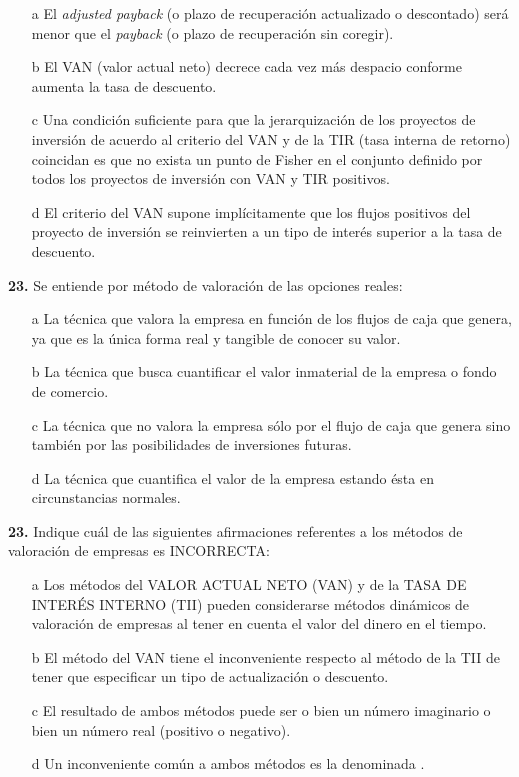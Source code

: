 \documentclass{nuevotema}
\begin{document}
\begin{enumerate}
    \item[a] El \textit{adjusted payback} (o plazo de recuperación actualizado o descontado) será menor que el \textit{payback} (o plazo de recuperación sin coregir).
    \item[b] El VAN (valor actual neto) decrece cada vez más despacio conforme aumenta la tasa de descuento.
    \item[c] Una condición suficiente para que la jerarquización de los proyectos de inversión de acuerdo al criterio del VAN y de la TIR (tasa interna de retorno) coincidan es que no exista un punto de Fisher en el conjunto definido por todos los proyectos de inversión con VAN y TIR positivos.
    \item[d] El criterio del VAN supone implícitamente que los flujos positivos del proyecto de inversión se reinvierten a un tipo de interés superior a la tasa de descuento.
\end{enumerate}

\textbf{23.} Se entiende por método de valoración de las opciones reales:

\begin{enumerate}
    \item[a] La técnica que valora la empresa en función de los flujos de caja que genera, ya que es la única forma real y tangible de conocer su valor.
    \item[b] La técnica que busca cuantificar el valor inmaterial de la empresa o fondo de comercio.
    \item[c] La técnica que no valora la empresa sólo por el flujo de caja que genera sino también por las posibilidades de inversiones futuras.
    \item[d] La técnica que cuantifica el valor de la empresa estando ésta en circunstancias normales.
\end{enumerate}


\textbf{23.} Indique cuál de las siguientes afirmaciones referentes a los métodos de valoración de empresas es INCORRECTA:

\begin{enumerate}
    \item[a] Los métodos del VALOR ACTUAL NETO (VAN) y de la TASA DE INTERÉS INTERNO (TII) pueden considerarse métodos dinámicos de valoración de empresas al tener en cuenta el valor del dinero en el tiempo.
    \item[b] El método del VAN tiene el inconveniente respecto al método de la TII de tener que especificar un tipo de actualización o descuento.
    \item[c] El resultado de ambos métodos puede ser o bien un número imaginario o bien un número real (positivo o negativo).
    \item[d] Un inconveniente común a ambos métodos es la denominada .
\end{enumerate}
\end{document}
